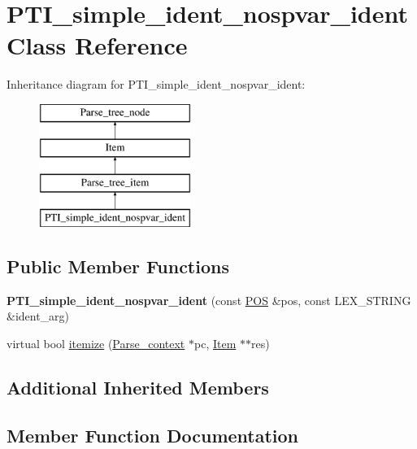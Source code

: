 \hypertarget{classPTI__simple__ident__nospvar__ident}{}\section{P\+T\+I\+\_\+simple\+\_\+ident\+\_\+nospvar\+\_\+ident Class Reference}
\label{classPTI__simple__ident__nospvar__ident}
Inheritance diagram for P\+T\+I\+\_\+simple\+\_\+ident\+\_\+nospvar\+\_\+ident\+:\begin{figure}[H]
\begin{center}
\leavevmode
\includegraphics[height=4.000000cm]{classPTI__simple__ident__nospvar__ident}
\end{center}
\end{figure}
\subsection*{Public Member Functions}
\begin{DoxyCompactItemize}
\item 
\mbox{\label{classPTI__simple__ident__nospvar__ident_aaa5c72b2ec680704a8fc693b20513b44}} 
{\bfseries P\+T\+I\+\_\+simple\+\_\+ident\+\_\+nospvar\+\_\+ident} (const \mbox{\hyperlink{structYYLTYPE}{P\+OS}} \&pos, const L\+E\+X\+\_\+\+S\+T\+R\+I\+NG \&ident\+\_\+arg)
\item 
virtual bool \mbox{\hyperlink{classPTI__simple__ident__nospvar__ident_ae6b43df14f3a747e60825b879e3b923c}{itemize}} (\mbox{\hyperlink{structParse__context}{Parse\+\_\+context}} $\ast$pc, \mbox{\hyperlink{classItem}{Item}} $\ast$$\ast$res)
\end{DoxyCompactItemize}
\subsection*{Additional Inherited Members}


\subsection{Member Function Documentation}
\mbox{\label{classPTI__simple__ident__nospvar__ident_ae6b43df14f3a747e60825b879e3b923c}} 
